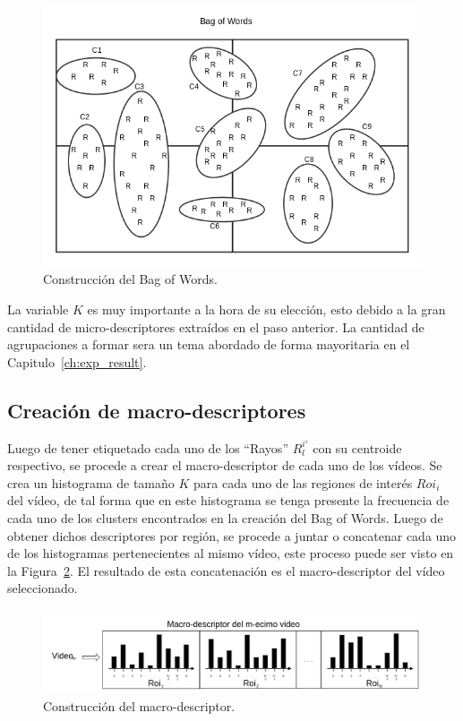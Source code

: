 	\begin{figure}[h]
		\centering
  		\label{algoritmo:fig:bow}
    		\includegraphics[width=1\textwidth]{Figuras/Diagramas/bow_solo.png}
  		\caption{Construcción del Bag of Words.}
	\end{figure}	
La variable $K$ es muy importante a la hora de su elección, esto debido a la gran cantidad de micro-descriptores extraídos en el paso anterior. La cantidad de agrupaciones a formar sera un tema abordado de forma mayoritaria en el Capitulo~\ref{ch:exp_result}.

	\subsection{Creación de macro-descriptores}
	\label{algoritmo:crea_macro-descriptores}
	Luego de tener etiquetado cada uno de los ``Rayos'' $R^{i'}_l$ con su centroide respectivo, se procede a crear el macro-descriptor de cada uno de los vídeos.	 Se crea un histograma de tamaño $K$ para cada uno de las regiones de interés $Roi_i$ del vídeo, de tal forma que en este histograma se tenga presente la frecuencia de cada uno de los clusters encontrados en la creación del Bag of Words. Luego de obtener dichos descriptores por región, se procede a juntar o concatenar cada uno de los histogramas pertenecientes al mismo vídeo, este proceso puede ser visto en la Figura~\ref{algoritmo:fig:macro-descriptores}. El resultado de esta concatenación es el macro-descriptor del vídeo seleccionado.
	\begin{figure}[h]
		\centering
  		\label{algoritmo:fig:macro-descriptores}
    		\includegraphics[width=1\textwidth]{Figuras/Diagramas/macro-descriptor.png}
  		\caption{Construcción del macro-descriptor.}
	\end{figure}	

